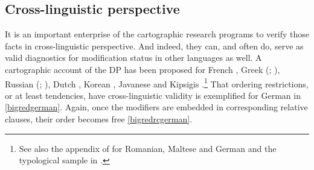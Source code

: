 
\subsection{Cross-linguistic perspective}

It is an important enterprise of the cartographic research programs to verify those facts in cross-linguistic perspective. And indeed, they can, and often do, serve as valid diagnostics for modification status in other languages as well. A cartographic account of the DP has been proposed for  French \citep{laenzlinger:2005:french, laenzlinger:2011:elements},  Greek (\citealt[appendix]{cinque:2010:adj}; \citealt{panayidou:2013:in}),  Russian (\citealt{siegel:1976:capturing}; \citealt[appendix]{cinque:2010:adj}),  Dutch \citep{belk:2017:attributes},  Korean \citep{kang:2005:adj, kang:2006:two, kim:2019:syntax},  Javanese \citep{vander:2009:direct} and  Kipsigis \citep{kouneli:2019:syntax}.\footnote{See also the appendix of \citet{cinque:2010:adj} for  Romanian,  Maltese and  German and the typological sample in \citet{laenzlinger:2010:cp, laenzlinger:2011:elements}.} That ordering restrictions, or at least tendencies, have cross-linguistic validity is exemplified for German in \ref{bigredgerman}. Again, once the modifiers are embedded in corresponding relative clauses, their order becomes free \ref{bigredrcgerman}.

